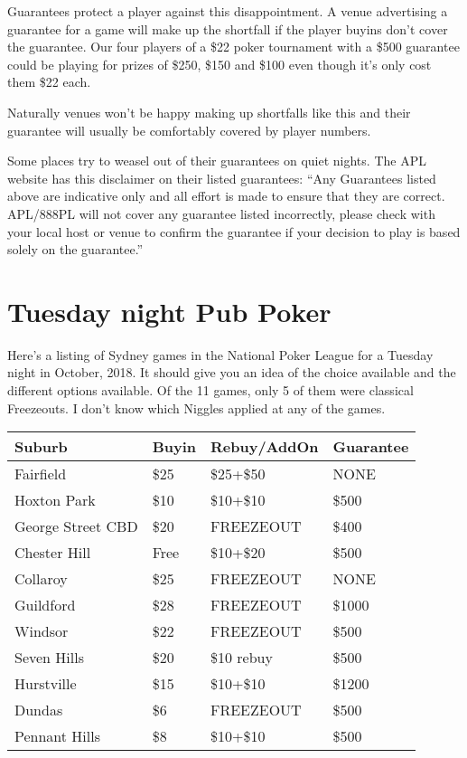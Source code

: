 Guarantees protect a player against this disappointment. A venue
advertising a guarantee for a game will make up the shortfall if the
player buyins don't cover the guarantee. Our four players of a \$22
poker tournament with a \$500 guarantee could be playing for prizes
of \$250, \$150 and \$100 even though it's only cost them \$22 each.

Naturally venues won't be happy making up shortfalls like this and
their guarantee will usually be comfortably covered by player numbers.

Some places try to weasel out of their guarantees on quiet nights.
The APL website has this disclaimer on their listed guarantees:
``Any Guarantees listed above are indicative only and all effort
is made to ensure that they are correct. APL/888PL will not cover
any guarantee listed incorrectly, please check with your local
host or venue to confirm the guarantee if your decision to
play is based solely on the guarantee.''

\section{Tuesday night Pub Poker}

Here's a listing of Sydney games in the National Poker League
for a Tuesday night in October, 2018. It should give you an
idea of the choice available and the different options available.
Of the 11 games, only 5 of them were classical Freezeouts.
I don't know which Niggles applied at any of the games.


\begin{tabular}{|l|l|l|l|} \hline
Suburb & Buyin & Rebuy/AddOn & Guarantee \\ \hline
Fairfield        & \$25 & \$25+\$50 & NONE \\ \hline
Hoxton Park       & \$10 & \$10+\$10 & \$500 \\ \hline
George Street CBD & \$20 & FREEZEOUT & \$400 \\ \hline
Chester Hill & Free & \$10+\$20 & \$500 \\ \hline
Collaroy & \$25 & FREEZEOUT & NONE \\ \hline
Guildford & \$28 & FREEZEOUT & \$1000 \\ \hline
Windsor & \$22 & FREEZEOUT & \$500 \\ \hline
Seven Hills & \$20 & \$10 rebuy & \$500 \\ \hline
Hurstville & \$15 & \$10+\$10 & \$1200 \\ \hline
Dundas & \$6 & FREEZEOUT & \$500 \\ \hline
Pennant Hills & \$8 & \$10+\$10 & \$500 \\ \hline
\end{tabular}

